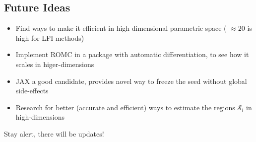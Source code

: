 \subsection{Future Ideas}

\begin{frame}
  \begin{itemize}
  \item Find ways to make it efficient in high dimensional parametric
    space ( \(\approx 20 \) is high for LFI methods)
  \item Implement ROMC in a package with automatic differentiation, to
    see how it scales in higer-dimensions
  \item JAX a good candidate, provides novel way to freeze the seed
    without global side-effects
  \item Research for better (accurate and efficient) ways to estimate
    the regions \( \mathcal{S}_i \) in high-dimensions
  \end{itemize}
  \noindent\makebox[\linewidth]{\rule{\paperwidth}{0.4pt}}
  Stay alert, there will be updates!
\end{frame}